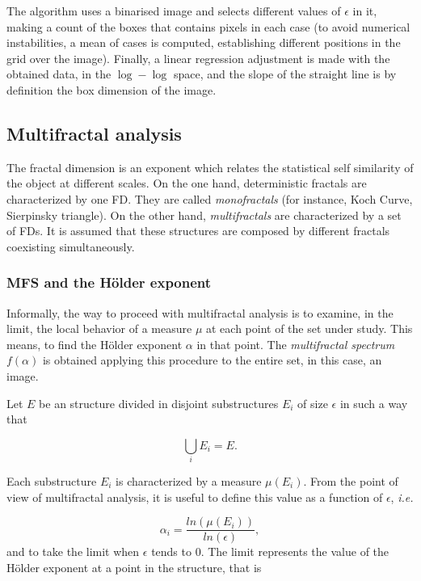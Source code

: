 The algorithm uses a binarised image and selects different values of $\epsilon$ in it, making a count of the boxes that contains pixels in each case (to avoid numerical instabilities, a mean of cases is computed, establishing different positions in the grid over the image). Finally, a linear regression adjustment is made with the obtained data, in the $\log-\log$ space, and the slope of the straight line is by definition the box dimension of the image. %


\subsection{Multifractal analysis}
\label{sec:4}
The fractal dimension is an exponent which relates the statistical self similarity of the object at different scales. On the one hand, deterministic fractals are characterized by one FD. They are called {\em monofractals} (for instance, Koch Curve, Sierpinsky triangle). On the other hand, {\em multifractals} \cite{Mandelbrot89} are characterized by a set of FDs. It is assumed that these structures are composed by different fractals coexisting simultaneously.

\subsubsection{MFS and the H\"older exponent}
\label{sec:5}
Informally, the way to proceed with multifractal analysis is to examine, in the limit, the local behavior of a measure $\mu$ at each point of the set under study. This means, to find the H\"older exponent $\alpha$ in that point. The {\em multifractal spectrum} $f(\alpha)$ is obtained applying this procedure to the entire set, in this case, an image.

Let $E$ be an structure divided in disjoint substructures $E_{i}$ of size $\epsilon$ in such a way that 

\begin{equation}
\displaystyle\bigcup_{i}E_{i} = E.
\end{equation}

Each substructure $E_{i}$ is characterized by a measure $\mu(E_{i})$. From the point of view of multifractal analysis, it is useful to define this value as a function of $\epsilon$, {\em i.e.}


\begin{equation}
\alpha_{i} = \frac{ln(\mu(E_{i}))}{ln(\epsilon)},
\label{eqn:eqn4}
\end{equation}
\noindent
and to take the limit when $\epsilon$ tends to $0$. The limit represents the value of the H\"older exponent at a point in the structure, that is

